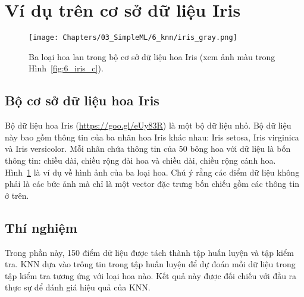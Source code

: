 \section{Ví dụ trên cơ sở dữ liệu Iris}

\begin{figure}[t]
\centering
    \texttt{[image: Chapters/03\_SimpleML/6\_knn/iris\_gray.png]}
    \caption[]{Ba loại hoa lan trong bộ cơ sở dữ liệu hoa Iris (xem ảnh màu trong Hình~\ref{fig:6_iris_c}).}
    \label{fig:6_iris}
\end{figure}


\subsection{Bộ cơ sở dữ liệu hoa Iris}

Bộ dữ liệu hoa Iris (\url{https://goo.gl/eUy83R}) là một bộ dữ liệu nhỏ. Bộ dữ
liệu này bao gồm thông tin của ba nhãn hoa Iris khác nhau: Iris setosa, Iris
virginica và Iris versicolor. Mỗi nhãn chứa thông tin của 50 bông hoa với dữ
liệu là bốn thông tin: chiều dài, chiều rộng đài hoa và chiều dài,
chiều rộng cánh hoa. Hình~\ref{fig:6_iris} là ví dụ về hình ảnh của ba
loại hoa. Chú ý rằng các điểm dữ liệu không phải là các bức ảnh mà chỉ là một
vector đặc trưng bốn chiếu gồm các thông tin ở trên.






\subsection{Thí nghiệm}


Trong phần này, 150 điểm dữ liệu được tách thành tập huấn luyện và tập kiểm tra.
KNN dựa vào trông tin trong tập huấn luyện để dự đoán mỗi dữ liệu trong tập kiểm
tra tương ứng với loại hoa nào. Kết quả này được đối chiếu với đầu ra thực sự
để đánh giá hiệu quả của KNN.

